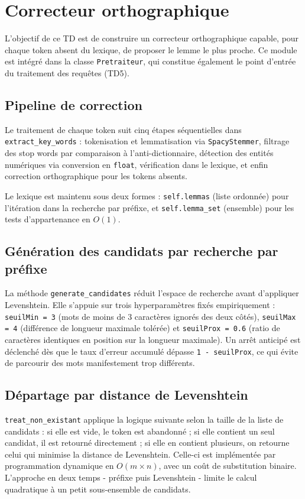 \chapter{Correcteur orthographique}

L'objectif de ce TD est de construire un correcteur orthographique capable, pour chaque token absent du lexique, de proposer le lemme le plus proche. Ce module est intégré dans la classe \texttt{Pretraiteur}, qui constitue également le point d'entrée du traitement des requêtes (TD5).

\section{Pipeline de correction}

Le traitement de chaque token suit cinq étapes séquentielles dans \texttt{extract\_key\_words} : tokenisation et lemmatisation via \texttt{SpacyStemmer}, filtrage des stop words par comparaison à l'anti-dictionnaire, détection des entités numériques via conversion en \texttt{float}, vérification dans le lexique, et enfin correction orthographique pour les tokens absents.

Le lexique est maintenu sous deux formes : \texttt{self.lemmas} (liste ordonnée) pour l'itération dans la recherche par préfixe, et \texttt{self.lemma\_set} (ensemble) pour les tests d'appartenance en $O(1)$.

\section{Génération des candidats par recherche par préfixe}

La méthode \texttt{generate\_candidates} réduit l'espace de recherche avant d'appliquer Levenshtein. Elle s'appuie sur trois hyperparamètres fixés empiriquement : \texttt{seuilMin = 3} (mots de moins de 3 caractères ignorés des deux côtés), \texttt{seuilMax = 4} (différence de longueur maximale tolérée) et \texttt{seuilProx = 0.6} (ratio de caractères identiques en position sur la longueur maximale). Un arrêt anticipé est déclenché dès que le taux d'erreur accumulé dépasse \texttt{1 - seuilProx}, ce qui évite de parcourir des mots manifestement trop différents.


\section{Départage par distance de Levenshtein}

\texttt{treat\_non\_existant} applique la logique suivante selon la taille de la liste de candidats : si elle est vide, le token est abandonné ; si elle contient un seul candidat, il est retourné directement ; si elle en contient plusieurs, on retourne celui qui minimise la distance de Levenshtein. Celle-ci est implémentée par programmation dynamique en $O(m \times n)$, avec un coût de substitution binaire. L'approche en deux temps - préfixe puis Levenshtein - limite le calcul quadratique à un petit sous-ensemble de candidats.


